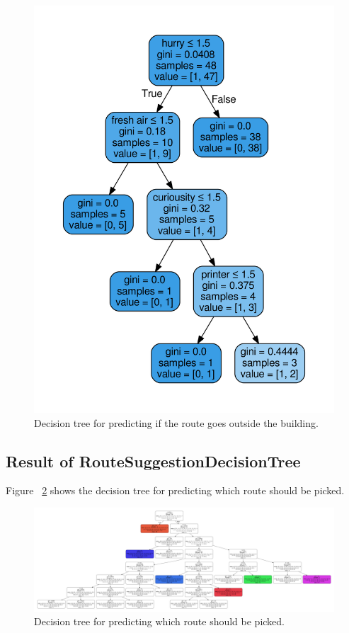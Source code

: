 \documentclass{sigchi}
\begin{document}
\begin{figure}[!h]
\centering
\includegraphics[width=1.0\columnwidth]{pics/decisionTree_8.png}
\caption{Decision tree for predicting if the route goes outside the building.}
\label{fig:dt8}
\end{figure}

\subsection{Result of RouteSuggestionDecisionTree}
Figure ~\ref{fig:dt9} shows the decision tree for predicting which route should be picked.
\begin{figure}[!h]
\centering
\includegraphics[width=1.0\columnwidth]{pics/routeDT.png}
\caption{Decision tree for predicting which route should be picked.}
\label{fig:dt9}
\end{figure}
\end{document}

